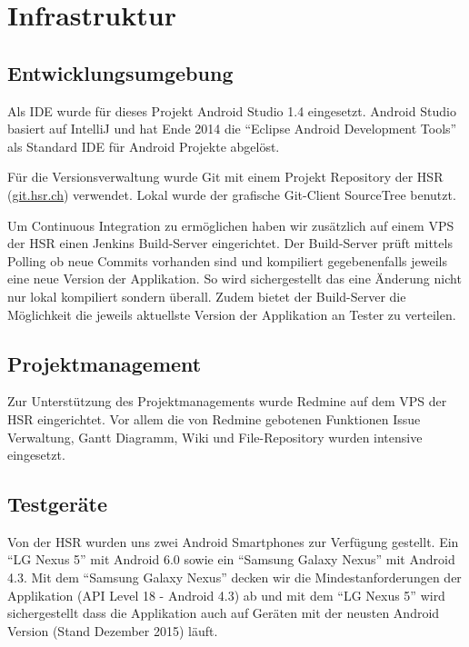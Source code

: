 \chapter{Infrastruktur}
\label{Infrastruktur}

\section{Entwicklungsumgebung}
Als \ac{IDE} wurde für dieses Projekt Android Studio 1.4 eingesetzt. Android Studio basiert auf IntelliJ und hat Ende 2014 die \enquote{Eclipse Android Development Tools} als Standard \ac{IDE} für Android Projekte abgelöst.\cite{android_studio_stable}

Für die Versionsverwaltung wurde Git mit einem Projekt Repository der \ac{HSR} (\url{git.hsr.ch}) verwendet. Lokal wurde der grafische Git-Client SourceTree benutzt.

Um Continuous Integration zu ermöglichen haben wir zusätzlich auf einem \ac{VPS} der \ac{HSR} einen Jenkins Build-Server eingerichtet. Der Build-Server prüft mittels Polling ob neue Commits vorhanden sind und kompiliert gegebenenfalls jeweils eine neue Version der Applikation. So wird sichergestellt das eine Änderung nicht nur lokal kompiliert sondern überall. Zudem bietet der Build-Server die Möglichkeit die jeweils aktuellste Version der Applikation an Tester zu verteilen.

\section{Projektmanagement}

Zur Unterstützung des Projektmanagements wurde Redmine auf dem \ac{VPS} der \ac{HSR} eingerichtet. Vor allem die von Redmine gebotenen Funktionen Issue Verwaltung, Gantt Diagramm, Wiki und File-Repository wurden intensive eingesetzt.

\section{Testgeräte}

Von der \ac{HSR} wurden uns zwei Android Smartphones zur Verfügung gestellt. Ein \enquote{LG Nexus 5} mit Android 6.0 sowie ein \enquote{Samsung Galaxy Nexus} mit Android 4.3. Mit dem \enquote{Samsung Galaxy Nexus} decken wir die Mindestanforderungen der Applikation (API Level 18 - Android 4.3) ab und mit dem \enquote{LG Nexus 5} wird sichergestellt dass die Applikation auch auf Geräten mit der neusten Android Version (Stand Dezember 2015) läuft.

